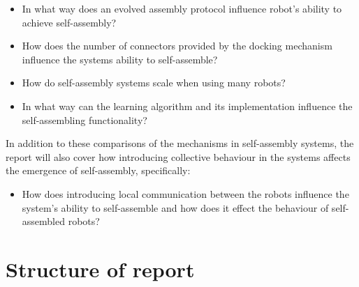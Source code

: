\begin{itemize}

\item In what way does an evolved assembly protocol influence robot’s ability to achieve self-assembly?

\item How does the number of connectors provided by the docking mechanism influence the systems ability to self-assemble?

\item How do self-assembly systems scale when using many robots?

\item In what way can the learning algorithm and its implementation influence the self-assembling functionality?

\end{itemize}

In addition to these comparisons of the mechanisms in self-assembly systems, the report will also cover how introducing collective behaviour in the systems affects the emergence of self-assembly, specifically:

\begin{itemize}

\item How does introducing local communication between the robots influence the system's ability to self-assemble and how does it effect the behaviour of self-assembled robots?

\end{itemize}

\section{Structure of report}

